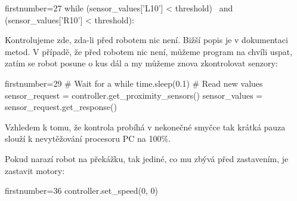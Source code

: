     \begin{pyc*}{firstnumber=27}
while (sensor_values['L10'] < threshold) \
       and (sensor_values['R10'] < threshold):
    \end{pyc*}

    Kontrolujeme zde, zda-li  před robotem nic není. Bižší popis je v
    dokumentaci metod. V případě, že před robotem nic není, můžeme program na
    chvíli uspat, zatím se robot posune o kus dál a my můžeme znova
    zkontrolovat senzory:

    \begin{pyc*}{firstnumber=29}
    # Wait for a while
    time.sleep(0.1)
    # Read new values
    sensor_request = controller.get_proximity_sensors()
    sensor_values = sensor_request.get_response()
    \end{pyc*}

    Vzhledem k tomu, že kontrola probíhá v nekonečné smyčce tak krátká pauza
    slouží k nevytěžování procesoru PC na 100\%.

    Pokud narazí robot na překážku, tak jediné, co mu zbývá před zastavením, je
    zastavit motory:

    \begin{pyc*}{firstnumber=36}
    controller.set_speed(0, 0)
    \end{pyc*}
